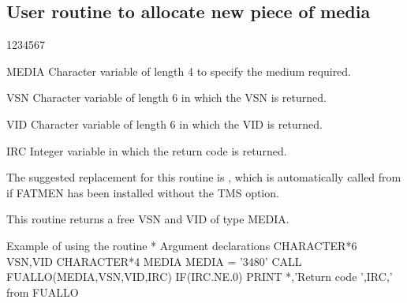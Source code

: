 \subsection{User routine to allocate new piece of media}
\begin{DLtt}{1234567}
\item[MEDIA]
Character variable of length 4 to specify the medium required.
\item[VSN]
Character variable of length 6 in which the VSN is returned.
\item[VID]
Character variable of length 6 in which the VID is returned.
\item[IRC]
Integer variable in which the return code is returned.
\end{DLtt}
\par
The suggested replacement for this routine is , which
is automatically called from  if FATMEN has been installed
without the TMS option.
\par
This routine returns a free VSN and VID of type MEDIA.
\begin{XMPt}{Example of using the routine \protect{}}
*     Argument declarations
      CHARACTER*6 VSN,VID
      CHARACTER*4 MEDIA
      MEDIA = '3480'
      CALL FUALLO(MEDIA,VSN,VID,IRC)
      IF(IRC.NE.0) PRINT *,'Return code ',IRC,' from FUALLO
\end{XMPt}
